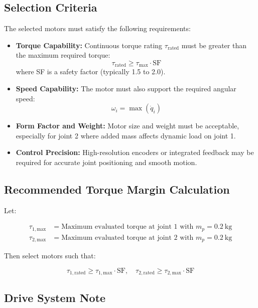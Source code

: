 \documentclass[a4paper,12pt]{article}
\begin{document}
\subsection*{Selection Criteria}

The selected motors must satisfy the following requirements:

\begin{itemize}
    \item \textbf{Torque Capability:} Continuous torque rating $\tau_{\text{rated}}$ must be greater than the maximum required torque:
    \[
    \tau_{\text{rated}} \geq \tau_{\text{max}} \cdot \text{SF}
    \]
    where SF is a safety factor (typically 1.5 to 2.0).
    
    \item \textbf{Speed Capability:} The motor must also support the required angular speed:
    \[
    \omega_i = \max(\dot{q}_i)
    \]

    \item \textbf{Form Factor and Weight:} Motor size and weight must be acceptable, especially for joint 2 where added mass affects dynamic load on joint 1.

    \item \textbf{Control Precision:} High-resolution encoders or integrated feedback may be required for accurate joint positioning and smooth motion.
\end{itemize}

\subsection*{Recommended Torque Margin Calculation}

Let:

\begin{align*}
\tau_{1,\text{max}} &= \text{Maximum evaluated torque at joint 1 with } m_p = 0.2~\text{kg} \\
\tau_{2,\text{max}} &= \text{Maximum evaluated torque at joint 2 with } m_p = 0.2~\text{kg}
\end{align*}

Then select motors such that:

\[
\tau_{1,\text{rated}} \geq \tau_{1,\text{max}} \cdot \text{SF}, \quad
\tau_{2,\text{rated}} \geq \tau_{2,\text{max}} \cdot \text{SF}
\]

\subsection*{Drive System Note}
\end{document}
